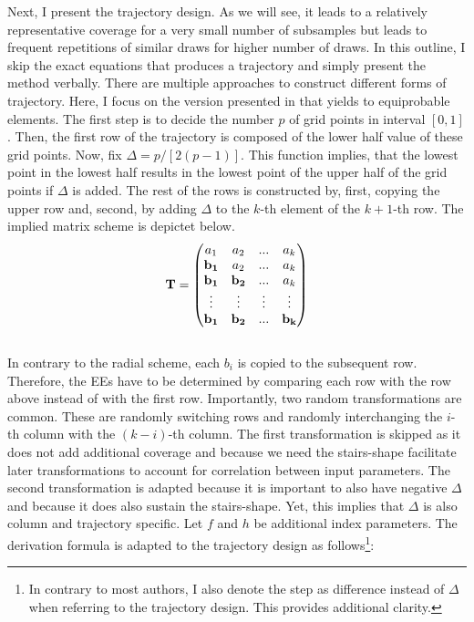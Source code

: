 \documentclass[a4paper,12pt]{article}
\begin{document}
\noindent
Next, I present the trajectory design. As we will see, it leads to a relatively representative coverage for a very small number of subsamples but leads to frequent repetitions of similar draws for higher number of draws.
In this outline, I skip the exact equations that produces a trajectory and simply present the method verbally.
There are multiple approaches to construct different forms of trajectory. Here, I focus on the version presented in \cite{Morris.1991} that yields to equiprobable elements. The first step is to decide the number $p$ of grid points in interval $[0,1]$. Then, the first row of the trajectory is composed of the lower half value of these grid points. Now, fix $\Delta = p/[2(p-1)]$. This function implies, that the lowest point in the lowest half results in the lowest point of the upper half of the grid points if $\Delta$ is added. The rest of the rows is constructed by, first, copying the upper row and, second, by adding $\Delta$ to the $k$-th element of the $k+1$-th row. The implied matrix scheme is depictet below.
\begin{align}
\bold{T} =
\begin{pmatrix}
a_1 & a_2 & ... & a_k \\
\bold{b_1} & a_2 & ... & a_k \\
\bold{b_1} & \bold{b_2} & ... & a_k \\
\vdots & \vdots & \vdots & \vdots\\
\bold{b_1} & \bold{b_2} & ... & \bold{b_k}
\end{pmatrix}
\end{align}
\\

\noindent
In contrary to the radial scheme, each $b_i$ is copied to the subsequent row. Therefore, the EEs have to be determined by comparing each row with the row above instead of with the first row.
Importantly, two random transformations are common. These are randomly switching rows and randomly interchanging the $i$-th column with the $(k-i)$-th column. The first transformation is skipped as it does not add additional coverage and because we need the stairs-shape facilitate later transformations to account for correlation between input parameters. The second transformation is adapted because it is important to also have negative $\Delta$ and because it does also sustain the stairs-shape. Yet, this implies that $\Delta$ is also column and trajectory specific. Let $f$ and $h$ be additional index parameters. The derivation formula is adapted to the trajectory design as follows\footnote{In contrary to most authors, I also denote the step as difference instead of $\Delta$ when referring to the trajectory design. This provides additional clarity.}:
\end{document}
